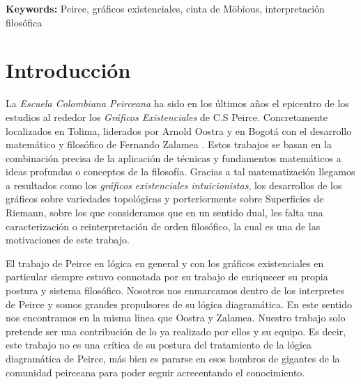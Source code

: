 \documentclass[
	fontsize=10pt, %
	twoside=false, %
	secnumdepth=1, %
	abstract=true, %
]{kaohandt}
\begin{document}
{\noindent\textbf{Keywords:} Peirce, gráficos existenciales, cinta de Möbious, interpretación filosófica}

\medskip


\section{Introducción}
\label{sec:Introducción}


La \textit{Escuela Colombiana Peirceana} ha sido en los últimos años el epicentro de los estudios al rededor los \textit{Gráficos Existenciales} de C.S Peirce. Concretamente localizados en Tolima, liderados por Arnold Oostra  y  en Bogotá con el desarrollo matemático y filosófico de Fernando Zalamea . Estos trabajos se basan en la combinación precisa de la aplicación de técnicas y fundamentos matemáticos a ideas profundas o conceptos de la filosofía.
Gracias a tal matematización llegamos a resultados como los \textit{gráficos existenciales intuicionistas}, los desarrollos de los gráficos sobre variedades topológicas y porteriormente sobre Superficies de Riemann, sobre los que consideramos que en un sentido dual, les falta una caracterización o reinterpretación de orden filosófico, la cual es una de las motivaciones de este trabajo.

El trabajo de Peirce en lógica en general y con los gráficos existenciales en particular siempre estuvo connotada por su trabajo de enriquecer su propia postura y sistema filosófico. Nosotros nos enmarcamos dentro de los interpretes de Peirce y somos grandes propulsores de su lógica diagramática. En este sentido nos encontramos en la misma línea que Oostra y Zalamea. Nuestro trabajo solo pretende ser una contribución de lo ya realizado por ellos y su equipo. Es decir, este trabajo no es una crítica de su postura del tratamiento de la lógica diagramática de Peirce, más bien es pararse en esos hombros de gigantes de la comunidad peirceana para poder seguir acrecentando el conocimiento.
\end{document}
